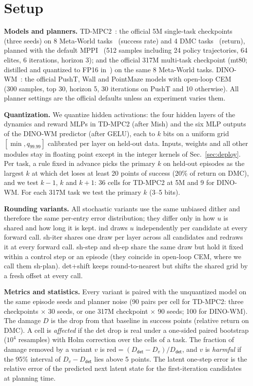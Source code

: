 \documentclass[conference]{IEEEtran}
\newcommand{\dtm}{\textsf{det}\xspace}
\newcommand{\shiter}{\textsf{sh-iter}\xspace}
\newcommand{\shstep}{\textsf{sh-step}\xspace}
\newcommand{\shep}{\textsf{sh-ep}\xspace}
\newcommand{\detshift}{\textsf{det+shift}\xspace}
\newcommand{\ind}{\textsf{ind}\xspace}
\begin{document}
\section{Setup}
\label{sec:setup}

\textbf{Models and planners.} TD-MPC2~\cite{hansen2024tdmpc2}: the official 5M single-task checkpoints (three seeds) on 8 Meta-World tasks~\cite{yu2019metaworld} (success rate) and 4 DMC tasks~\cite{tassa2018dmc} (return), planned with the default MPPI~\cite{williams2017mppi} (512 samples including 24 policy trajectories, 64 elites, 6 iterations, horizon 3); and the official 317M multi-task checkpoint (mt80; distilled and quantized to FP16 in~\cite{kuzmenko2025tdmpcopt}) on the same 8 Meta-World tasks. DINO-WM~\cite{zhou2025dinowm}: the official PushT, Wall and PointMaze models with open-loop CEM~\cite{rubinstein1999cem} (300 samples, top 30, horizon 5, 30 iterations on PushT and 10 otherwise). All planner settings are the official defaults unless an experiment varies them.

\textbf{Quantization.} We quantize hidden activations: the four hidden layers of the dynamics and reward MLPs in TD-MPC2 (after Mish) and the six MLP outputs of the DINO-WM predictor (after GELU), each to $k$ bits on a uniform grid $[\min, q_{99.99}]$ calibrated per layer on held-out data. Inputs, weights and all other modules stay in floating point except in the integer kernels of Sec.~\ref{sec:deploy}. Per task, a rule fixed in advance picks the primary $k$ on held-out episodes as the largest $k$ at which \dtm loses at least 20 points of success (20\% of return on DMC), and we test $k-1$, $k$ and $k+1$: 36 cells for TD-MPC2 at 5M and 9 for DINO-WM. For each 317M task we test the primary $k$ (3--5 bits).

\textbf{Rounding variants.} All stochastic variants use the same unbiased dither and therefore the same per-entry error distribution; they differ only in how $u$ is shared and how long it is kept. \ind draws $u$ independently per candidate at every forward call. \shiter shares one draw per layer across all candidates and redraws it at every forward call. \shstep and \shep share the same draw but hold it fixed within a control step or an episode (they coincide in open-loop CEM, where we call them sh-plan). \detshift keeps round-to-nearest but shifts the shared grid by a fresh offset at every call.

\textbf{Metrics and statistics.} Every variant is paired with the unquantized model on the same episode seeds and planner noise (90 pairs per cell for TD-MPC2: three checkpoints $\times$ 30 seeds, or one 317M checkpoint $\times$ 90 seeds; 100 for DINO-WM). The damage $D$ is the drop from that baseline in success points (relative return on DMC). A cell is \emph{affected} if the \dtm drop is real under a one-sided paired bootstrap ($10^4$ resamples) with Holm correction over the cells of a task. The fraction of damage removed by a variant $v$ is $\mathrm{red}=(D_{\dtm}-D_v)/D_{\dtm}$, and $v$ is \emph{harmful} if the 95\% interval of $D_v-D_{\dtm}$ lies above 5 points. The latent one-step error is the relative error of the predicted next latent state for the first-iteration candidates at planning time.
\end{document}
